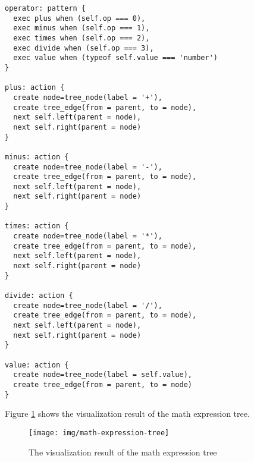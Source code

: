 \begin{lstlisting}
operator: pattern {
  exec plus when (self.op === 0),
  exec minus when (self.op === 1),
  exec times when (self.op === 2),
  exec divide when (self.op === 3),
  exec value when (typeof self.value === 'number')
}

plus: action {
  create node=tree_node(label = '+'),
  create tree_edge(from = parent, to = node),
  next self.left(parent = node),
  next self.right(parent = node)
}

minus: action {
  create node=tree_node(label = '-'),
  create tree_edge(from = parent, to = node),
  next self.left(parent = node),
  next self.right(parent = node)
}

times: action {
  create node=tree_node(label = '*'),
  create tree_edge(from = parent, to = node),
  next self.left(parent = node),
  next self.right(parent = node)
}

divide: action {
  create node=tree_node(label = '/'),
  create tree_edge(from = parent, to = node),
  next self.left(parent = node),
  next self.right(parent = node)
}

value: action {
  create node=tree_node(label = self.value),
  create tree_edge(from = parent, to = node)
}
\end{lstlisting}

Figure \ref{fig: math expression tree} shows the visualization result of the math expression tree.

\begin{figure}
  \begin{center}
    \texttt{[image: img/math-expression-tree]}
    \caption{The visualization result of the math expression tree}
    \label{fig: math expression tree}
  \end{center}
\end{figure}
